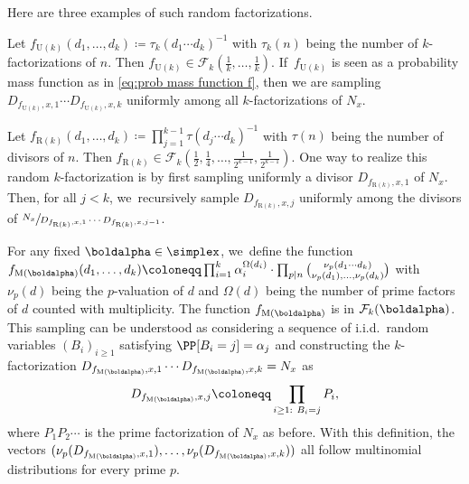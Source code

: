 Here are three examples of such random factorizations.

\begin{example}
\label{ex:uniform sampling}
Let $f_{\mathrm U(k)}(d_1, \ldots, d_k) \coloneqq \tau_k(d_1\cdots d_k)^{-1}$ with $\tau_k(n)$ being the number of $k$-factorizations of $n$. Then $f_{\mathrm U(k)} \in \mathcal F_k(\frac{1}{k}, \ldots, \frac{1}{k})$. If~$f_{\mathrm U(k)}$ is seen as a probability mass function as in \eqref{eq:prob mass function f}, then we are sampling $D_{f_{\mathrm U(k)}, x, 1}\cdots D_{f_{\mathrm U(k)}, x, k}$ uniformly among all $k$-factorizations of $N_x$.
\end{example}

\begin{example}
\label{ex:recursive sampling}
Let $f_{\mathrm R(k)}(d_1, \ldots, d_k) \coloneqq \prod_{j=1}^{k-1} \tau(d_j \cdots d_k)^{-1}$ with $\tau(n)$ being the number of divisors of $n$. Then $f_{\mathrm R(k)} \in \mathcal F_k(\frac{1}{2}, \frac{1}{4}, \ldots, \frac{1}{2^{k-1}}, \frac{1}{2^{k-1}})$. One way to realize this random $k$-factorization is by first sampling uniformly a divisor $D_{f_{\mathrm R(k)}, x, 1}$ of $N_x$. Then, for all $j < k$, we~recursively sample $D_{f_{\mathrm R(k)}, x, j}$ uniformly among the divisors of $\sfrac{N_x}{D_{f_{\mathrm R(k)}, x, 1} \cdots D_{f_{\mathrm R(k)}, x, j-1}}$.
\end{example}

\begin{example}
\label{ex:multinomial sampling}
For any fixed $\boldalpha \in \simplex$, we~define the function $f_{\mathrm M(\boldalpha)}(d_1, \ldots, d_k) \coloneqq \prod_{i=1}^{k} \alpha_i^{\Omega(d_i)} \cdot \prod_{p|n} \binom{\nu_p(d_1\cdots d_k)}{\nu_p(d_1), \ldots, \nu_p(d_k)}$ with $\nu_p(d)$ being the $p$\nobreakdash-valuation of $d$ and $\Omega(d)$ being the number of prime factors of $d$ counted with multiplicity. The function $f_{\mathrm M(\boldalpha)}$ is in $\mathcal F_k(\boldalpha)$. This sampling can be understood as considering a sequence of i.i.d.~random variables $(B_i)_{i \ge 1}$ satisfying $\PP[B_i = j] = \alpha_j$ and constructing the $k$-factorization $D_{f_{\mathrm M(\boldalpha)}, x,1}\cdots D_{f_{\mathrm M(\boldalpha)}, x,k} = N_x$ as
\[
D_{f_{\mathrm M(\boldalpha)}, x,j} \coloneqq \prod_{\substack{i\ge 1:\ B_i = j}} P_i,
\]
where $P_1 P_2 \cdots$ is the prime factorization of $N_x$ as before. With this definition, the vectors $(\nu_p(D_{f_{\mathrm M(\boldalpha)}, x,1}), \dots, \nu_p(D_{f_{\mathrm M(\boldalpha)}, x,k}))$ all follow multinomial distributions for every prime $p$.
\end{example}


